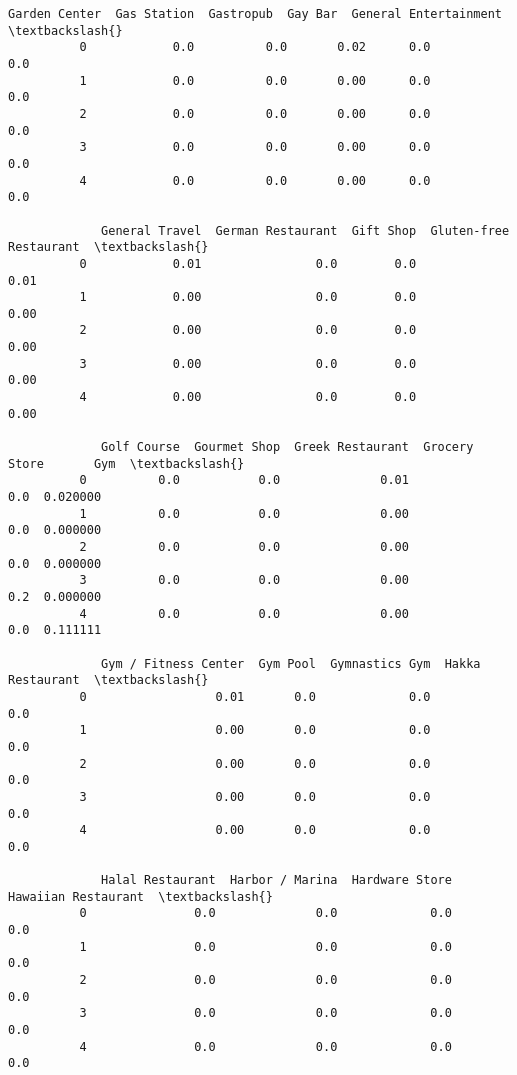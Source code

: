 \documentclass[11pt]{article}
\begin{document}
\begin{Verbatim}[commandchars=\\\{\}]
             Garden Center  Gas Station  Gastropub  Gay Bar  General Entertainment  \textbackslash{}
          0            0.0          0.0       0.02      0.0                    0.0   
          1            0.0          0.0       0.00      0.0                    0.0   
          2            0.0          0.0       0.00      0.0                    0.0   
          3            0.0          0.0       0.00      0.0                    0.0   
          4            0.0          0.0       0.00      0.0                    0.0   
          
             General Travel  German Restaurant  Gift Shop  Gluten-free Restaurant  \textbackslash{}
          0            0.01                0.0        0.0                    0.01   
          1            0.00                0.0        0.0                    0.00   
          2            0.00                0.0        0.0                    0.00   
          3            0.00                0.0        0.0                    0.00   
          4            0.00                0.0        0.0                    0.00   
          
             Golf Course  Gourmet Shop  Greek Restaurant  Grocery Store       Gym  \textbackslash{}
          0          0.0           0.0              0.01            0.0  0.020000   
          1          0.0           0.0              0.00            0.0  0.000000   
          2          0.0           0.0              0.00            0.0  0.000000   
          3          0.0           0.0              0.00            0.2  0.000000   
          4          0.0           0.0              0.00            0.0  0.111111   
          
             Gym / Fitness Center  Gym Pool  Gymnastics Gym  Hakka Restaurant  \textbackslash{}
          0                  0.01       0.0             0.0               0.0   
          1                  0.00       0.0             0.0               0.0   
          2                  0.00       0.0             0.0               0.0   
          3                  0.00       0.0             0.0               0.0   
          4                  0.00       0.0             0.0               0.0   
          
             Halal Restaurant  Harbor / Marina  Hardware Store  Hawaiian Restaurant  \textbackslash{}
          0               0.0              0.0             0.0                  0.0   
          1               0.0              0.0             0.0                  0.0   
          2               0.0              0.0             0.0                  0.0   
          3               0.0              0.0             0.0                  0.0   
          4               0.0              0.0             0.0                  0.0   
          

\end{Verbatim}
\end{document}
